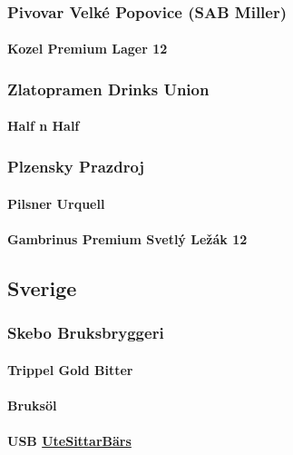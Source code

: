 \documentclass[11pt]{article}
\begin{document}
\subsubsection{Pivovar Velké Popovice (SAB Miller)}
\label{sec:orgf827e0a}
\paragraph{Kozel Premium Lager 12}
\label{sec:org4b168de}
\subsubsection{Zlatopramen Drinks Union}
\label{sec:orgf2b5cb5}
\paragraph{Half n Half}
\label{sec:orgf450f73}
\subsubsection{Plzensky Prazdroj}
\label{sec:orgf613cdc}
\paragraph{Pilsner Urquell}
\label{sec:org4c79f58}
\paragraph{Gambrinus Premium Svetlý Ležák 12}
\label{sec:orgd758ba1}
\subsection{Sverige}
\label{sec:org58a1595}
\subsubsection{Skebo Bruksbryggeri}
\label{sec:orga4afb77}
\paragraph{Trippel Gold Bitter}
\label{sec:orgf5f9f84}
\paragraph{Bruksöl}
\label{sec:org680eb1c}
\paragraph{USB \underline{UteSittarBärs}}
\label{sec:org9af6448}
\end{document}
